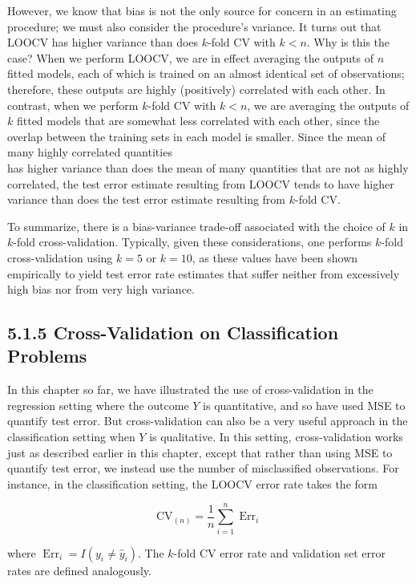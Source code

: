 \documentclass[10pt]{article}
\begin{document}
However, we know that bias is not the only source for concern in an estimating procedure; we must also consider the procedure's variance. It turns out that LOOCV has higher variance than does $k$-fold CV with $k<n$. Why is this the case? When we perform LOOCV, we are in effect averaging the outputs of $n$ fitted models, each of which is trained on an almost identical set of observations; therefore, these outputs are highly (positively) correlated with each other. In contrast, when we perform $k$-fold CV with $k<n$, we are averaging the outputs of $k$ fitted models that are somewhat less correlated with each other, since the overlap between the training sets in each model is smaller. Since the mean of many highly correlated quantities\\
has higher variance than does the mean of many quantities that are not as highly correlated, the test error estimate resulting from LOOCV tends to have higher variance than does the test error estimate resulting from $k$-fold CV.

To summarize, there is a bias-variance trade-off associated with the choice of $k$ in $k$-fold cross-validation. Typically, given these considerations, one performs $k$-fold cross-validation using $k=5$ or $k=10$, as these values have been shown empirically to yield test error rate estimates that suffer neither from excessively high bias nor from very high variance.

\subsection*{5.1.5 Cross-Validation on Classification Problems}
In this chapter so far, we have illustrated the use of cross-validation in the regression setting where the outcome $Y$ is quantitative, and so have used MSE to quantify test error. But cross-validation can also be a very useful approach in the classification setting when $Y$ is qualitative. In this setting, cross-validation works just as described earlier in this chapter, except that rather than using MSE to quantify test error, we instead use the number of misclassified observations. For instance, in the classification setting, the LOOCV error rate takes the form


\begin{equation*}
\mathrm{CV}_{(n)}=\frac{1}{n} \sum_{i=1}^{n} \operatorname{Err}_{i} \tag{5.4}
\end{equation*}


where $\operatorname{Err}_{i}=I\left(y_{i} \neq \hat{y}_{i}\right)$. The $k$-fold CV error rate and validation set error rates are defined analogously.
\end{document}
